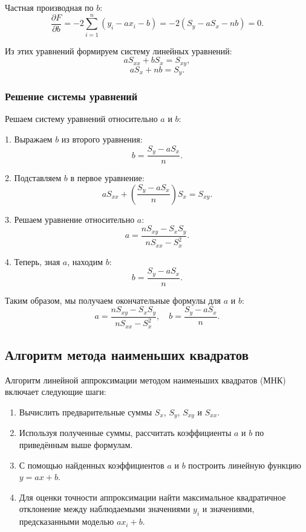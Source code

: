 Частная производная по $b$:
\[
\frac{\partial F}{\partial b} = -2 \sum_{i=1}^{n} (y_i - ax_i - b) = -2(S_y - aS_x - nb) = 0.
\]

Из этих уравнений формируем систему линейных уравнений:
\[
aS_{xx} + bS_x = S_{xy},
\]
\[
aS_x + nb = S_y.
\]

\subsubsection{Решение системы уравнений}
Решаем систему уравнений относительно $a$ и $b$:

1. Выражаем $b$ из второго уравнения:
\[
b = \frac{S_y - aS_x}{n}.
\]

2. Подставляем $b$ в первое уравнение:
\[
aS_{xx} + \left(\frac{S_y - aS_x}{n}\right)S_x = S_{xy}.
\]

3. Решаем уравнение относительно $a$:
\[
a = \frac{nS_{xy} - S_xS_y}{nS_{xx} - S_x^2}.
\]

4. Теперь, зная $a$, находим $b$:
\[
b = \frac{S_y - aS_x}{n}.
\]

Таким образом, мы получаем окончательные формулы для $a$ и $b$:
\[
a = \frac{nS_{xy} - S_xS_y}{nS_{xx} - S_x^2}, \quad b = \frac{S_y - aS_x}{n}.
\]

\subsection{Алгоритм метода наименьших квадратов}
Алгоритм линейной аппроксимации методом наименьших квадратов (МНК) включает следующие шаги:
\begin{enumerate}
  \item Вычислить предварительные суммы $S_x$, $S_y$, $S_{xy}$ и $S_{xx}$.
  \item Используя полученные суммы, рассчитать коэффициенты $a$ и $b$ по приведённым выше формулам.
  \item С помощью найденных коэффициентов $a$ и $b$ построить линейную функцию $y = ax + b$.
  \item Для оценки точности аппроксимации найти максимальное квадратичное отклонение между наблюдаемыми значениями $y_i$ и значениями, предсказанными моделью $ax_i + b$.
\end{enumerate}
